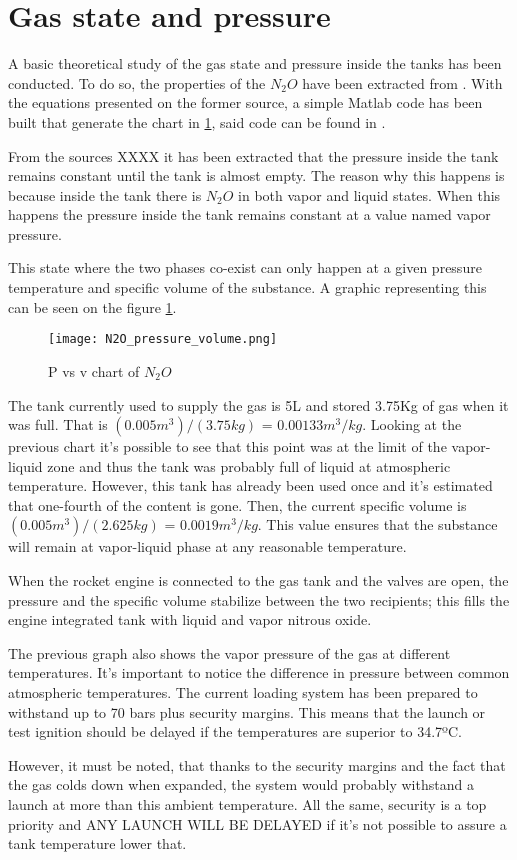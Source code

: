
\section*{Gas state and pressure}

A basic theoretical study of the gas state and pressure inside the tanks has been conducted. To do so, the properties of the $N_2O$ have been extracted from \cite{n2oReference}. With the equations presented on the former source, a simple Matlab code has been built that generate the chart in \ref{fig:N2O_P_V_graph}, said code can be found in \cite{MatlabPVchart}.

From the sources XXXX it has been extracted that the pressure inside the tank remains constant until the tank is almost empty. The reason why this happens is because inside the tank there is $N_2O$ in both vapor and liquid states. When this happens the pressure inside the tank remains constant at a value named vapor pressure.

This state where the two phases co-exist can only happen at a given pressure temperature and specific volume of the substance. A graphic representing this can be seen on the figure \ref{fig:N2O_P_V_graph}.

\begin{figure}[h]
  \centering
  \texttt{[image: N2O\_pressure\_volume.png]}
  \caption{P vs v chart of $N_2O$}
  \label{fig:N2O_P_V_graph}
\end{figure}

The tank currently used to supply the gas is 5L and stored 3.75Kg of gas when it was full. That is $(0.005 m^3) / (3.75 kg)$ = $0.00133 m^3/kg$. Looking at the previous chart it's possible to see that this point was at the limit of the vapor-liquid zone and thus the tank was probably full of liquid at atmospheric temperature. However, this tank has already been used once and it's estimated that one-fourth of the content is gone. Then, the current specific volume is $(0.005 m^3) / (2.625 kg)$ = $0.0019 m^3/kg$. This value ensures that the substance will remain at vapor-liquid phase at any reasonable temperature.

When the rocket engine is connected to the gas tank and the valves are open, the pressure and the specific volume stabilize between the two recipients; this fills the engine integrated tank with liquid and vapor nitrous oxide.

The previous graph also shows the vapor pressure of the gas at different temperatures. It's important to notice the difference in pressure between common atmospheric temperatures. The current loading system has been prepared to withstand up to 70 bars plus security margins. This means that the launch or test ignition should be delayed if the temperatures are superior to 34.7ºC.

However, it must be noted, that thanks to the security margins and the fact that the gas colds down when expanded, the system would probably withstand a launch at more than this ambient temperature. All the same, security is a top priority and ANY LAUNCH WILL BE DELAYED if it's not possible to assure a tank temperature lower that.